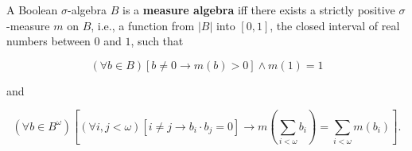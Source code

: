 A Boolean $\sigma$-algebra $B$ is a \textbf{measure algebra} iff there exists a strictly positive $\sigma$-measure $m$ on $B$, i.e., a function from $|B|$ into $[0, 1]$, the closed interval of real numbers between $0$ and $1$, such that

$$(\forall b \in B) [b \neq 0 \rightarrow m(b) > 0] \wedge m(1) = 1$$

and

$$(\forall b \in B^{\omega}) \left[ (\forall i, j < \omega) [i \neq j \rightarrow b_i \cdot b_j = 0] \rightarrow m \left( \sum_{i < \omega} b_i \right) = \sum_{i < \omega} m(b_i) \right].$$
